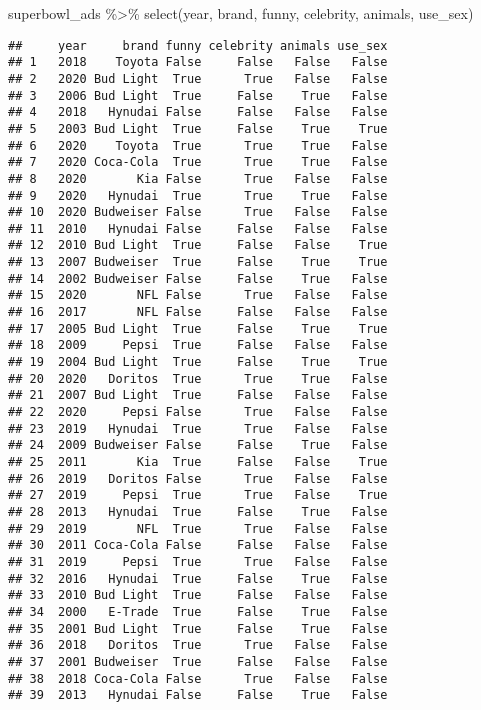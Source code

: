 \documentclass[
]{article}
\newenvironment{Shaded}{\begin{snugshade}}{\end{snugshade}}
\newcommand{\FunctionTok}[1]{\textcolor[rgb]{0.00,0.00,0.00}{#1}}
\newcommand{\NormalTok}[1]{#1}
\newcommand{\SpecialCharTok}[1]{\textcolor[rgb]{0.00,0.00,0.00}{#1}}
\begin{document}
\begin{Shaded}
\begin{Highlighting}[]
\NormalTok{superbowl\_ads }\SpecialCharTok{\%\textgreater{}\%} \FunctionTok{select}\NormalTok{(year, brand, funny, celebrity, animals, use\_sex)}
\end{Highlighting}
\end{Shaded}

\begin{verbatim}
##     year     brand funny celebrity animals use_sex
## 1   2018    Toyota False     False   False   False
## 2   2020 Bud Light  True      True   False   False
## 3   2006 Bud Light  True     False    True   False
## 4   2018   Hynudai False     False   False   False
## 5   2003 Bud Light  True     False    True    True
## 6   2020    Toyota  True      True    True   False
## 7   2020 Coca-Cola  True      True    True   False
## 8   2020       Kia False      True   False   False
## 9   2020   Hynudai  True      True    True   False
## 10  2020 Budweiser False      True   False   False
## 11  2010   Hynudai False     False   False   False
## 12  2010 Bud Light  True     False   False    True
## 13  2007 Budweiser  True     False    True    True
## 14  2002 Budweiser False     False    True   False
## 15  2020       NFL False      True   False   False
## 16  2017       NFL False     False   False   False
## 17  2005 Bud Light  True     False    True    True
## 18  2009     Pepsi  True     False   False   False
## 19  2004 Bud Light  True     False    True    True
## 20  2020   Doritos  True      True    True   False
## 21  2007 Bud Light  True     False   False   False
## 22  2020     Pepsi False      True   False   False
## 23  2019   Hynudai  True      True   False   False
## 24  2009 Budweiser False     False    True   False
## 25  2011       Kia  True     False   False    True
## 26  2019   Doritos False      True   False   False
## 27  2019     Pepsi  True      True   False    True
## 28  2013   Hynudai  True     False    True   False
## 29  2019       NFL  True      True   False   False
## 30  2011 Coca-Cola False     False   False   False
## 31  2019     Pepsi  True      True   False   False
## 32  2016   Hynudai  True     False    True   False
## 33  2010 Bud Light  True     False   False   False
## 34  2000   E-Trade  True     False    True   False
## 35  2001 Bud Light  True     False    True   False
## 36  2018   Doritos  True      True   False   False
## 37  2001 Budweiser  True     False   False   False
## 38  2018 Coca-Cola False      True   False   False
## 39  2013   Hynudai False     False    True   False

\end{verbatim}
\end{document}

